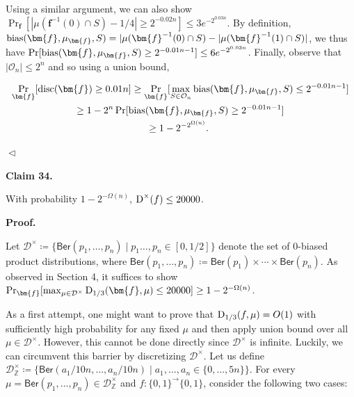 Using a similar argument, we can also show $\Pr_{\bm{f}}[|\mu(\bm{f}^{-1}(0)\cap S)-1/4|\geq 2^{-0.02n}]\leq 3e^{-2^{0.03n}}$.
By definition, ${\textup{bias}}(\bm{f},\mu_{\bm{f}},S)=|\mu(\bm{f}^{-1}(0)\cap S)-|\mu(\bm{f}^{-1}(1)\cap S)|$, we thus have $\Pr[{\textup{bias}}(\bm{f},\mu_{\bm{f}},S)\geq 2^{-0.01n-1}]\leq 6e^{-2^{0.03n}}$. Finally, observe that $|\mathcal{O}_{n}|\leq 2^{n}$ and so using a union bound,\par


\[\begin{gathered}
\displaystyle\Pr_{\bm{f}}[{\textup{disc}}(\bm{f})\geq 0.01n] \displaystyle\geq\Pr_{\bm{f}}[\max_{S\in\mathcal{O}_{n}}{\textup{bias}}(\bm{f},\mu_{\bm{f}},S)\leq 2^{-0.01n-1}] \\
\displaystyle\geq 1-2^{n}\Pr[{\textup{bias}}(\bm{f},\mu_{\bm{f}},S)\geq 2^{-0.01n-1}] \\
\displaystyle\geq 1-2^{-2^{\Omega(n)}}.\
\end{gathered}\]


$\vartriangleleft$\par





\par\medskip\noindent\textbf{
Claim 34. 
}\par



With probability $1-2^{-\Omega(n)}$, ${\textup{D}}^{\times}(f)\leq 20000$.\par







\par\medskip\noindent\textbf{
\textbf{Proof}.}\par




Let $\mathcal{D}^{\times}\coloneqq\{\mathsf{Ber}(p_{1},\ldots,p_{n})\mid p_{1}\ldots,p_{n}\in[0,1/2]\}$ denote the set of $0$-biased product distributions, where $\mathsf{Ber}(p_{1},\ldots,p_{n})\coloneqq\mathsf{Ber}(p_{1})\times\cdots\times\mathsf{Ber}(p_{n})$.
As observed in Section 4, it suffices to show $\Pr_{\bm{f}}[\max_{\mu\in\mathcal{D}^{\times}}{\textup{D}}_{1/3}(\bm{f},\mu)\leq 20000]\geq 1-2^{-\Omega(n)}$.\par




As a first attempt, one might want to prove that ${\textup{D}}_{1/3}(f,\mu)=O(1)$ with sufficiently high probability for any fixed $\mu$ and then apply union bound over all $\mu\in\mathcal{D}^{\times}$.
However, this cannot be done directly since $\mathcal{D}^{\times}$ is infinite.
Luckily, we can circumvent this barrier by discretizing $\mathcal{D}^{\times}$. Let us define $\mathcal{D}^{\times}_{\mathbb{Z}}\coloneqq\{\mathsf{Ber}(a_{1}/10n,\ldots,a_{n}/10n)\mid a_{1},\ldots,a_{n}\in\{0,\ldots,5n\}\}$. For every $\mu=\mathsf{Ber}(p_{1},\ldots,p_{n})\in\mathcal{D}^{\times}_{\mathbb{Z}}$ and $f:\{0,1\}^{\to}\{0,1\}$, consider the following two cases:\par


